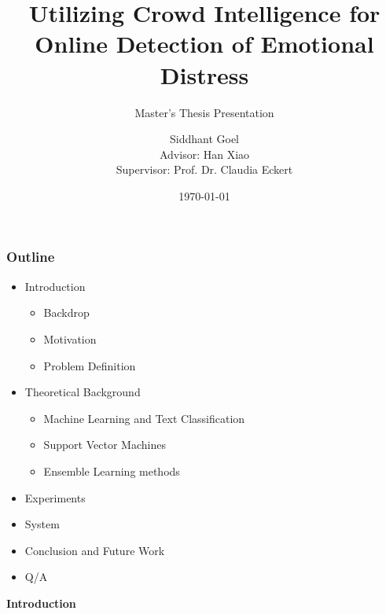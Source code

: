 \documentclass[xcolor=table]{beamer}
\title{Utilizing Crowd Intelligence for Online Detection of Emotional Distress}
\subtitle{Master's Thesis Presentation}
\author[Siddhant Goel]{Siddhant Goel\\{\small Advisor: Han Xiao\\Supervisor: Prof. Dr. Claudia Eckert}}
\institute{
Chair for IT Security\\
Technische Universit\"at M\"unchen
}
\date{\today}
\begin{document}
    \begin{frame}[plain]
        \titlepage
    \end{frame}
    
    \begin{frame}
        \frametitle{Outline}
        \begin{itemize}
            \item{
            Introduction
            \begin{itemize}
                \item{Backdrop}
                \item{Motivation}
                \item{Problem Definition}
            \end{itemize}
            }
            \pause
            \item{
            Theoretical Background
            \begin{itemize}
                \item{Machine Learning and Text Classification}
                \item{Support Vector Machines}
                \item{Ensemble Learning methods}
            \end{itemize}
            }
            \pause
            \item{Experiments}
            \item{System}
            \item{Conclusion and Future Work}
            \item{Q/A}
        \end{itemize}
    \end{frame}
    
    \begin{frame}
        \begin{center}
            \textbf{Introduction}
        \end{center}
    \end{frame}
    
\end{document}
